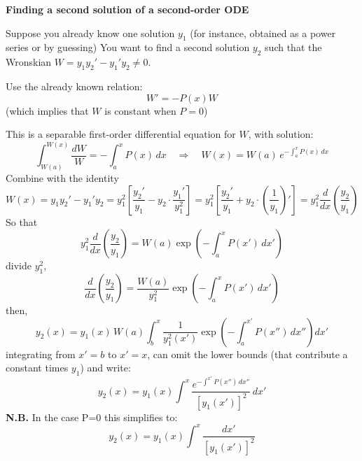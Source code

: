\documentclass{article}
\begin{document}
\vspace{2mm}\noindent
\textbf{Finding a second solution of a second-order ODE}

\noindent
Suppose you already know one solution $y_1$ (for instance, obtained as a power series or by guessing) You want to find a second solution $y_2$ such that the Wronskian $W = y_1 y_2' - y_1' y_2 \neq 0$.

\noindent
Use the already known relation:
\begin{equation}
    W' = -P(x) W
\end{equation}
(which implies that $W$ is constant when $P=0$)

\noindent
This is a separable first-order differential equation for $W$, with solution:
\begin{equation}
    \int_{W(a)}^{W(x)} \frac{dW}{W} = -\int_{a}^{x} P(x)\,dx 
\quad \Rightarrow \quad 
W(x) = W(a) \, e^{- \int_{a}^{x} P(x)\,dx}
\end{equation}
Combine with the identity
\begin{equation}
    W(x) = y_1 y_2' - y_1' y_2 
= y_1^2 \left[ \frac{y_2'}{y_1} - y_2 \cdot \frac{y_1'}{y_1 ^2} \right] 
= y_1^2 \left[ \frac{y_2'}{y_1} + y_2 \cdot \left(\frac{1}{y_1} \right)' \right] 
= y_1^2 \frac{d}{dx} \left( \frac{y_2}{y_1} \right)
\end{equation}
So that
\begin{equation}
y_1^2 \frac{d}{dx} \left( \frac{y_2}{y_1} \right) = W(a) \exp\left( -\int_a^x P(x') \, dx' \right)
\end{equation}
divide $y_1 ^2$,
\begin{equation}
    \frac{d}{dx} \left( \frac{y_2}{y_1} \right) = \frac{W(a)}{y_1 ^2} \exp\left( -\int_a^x P(x') \, dx' \right)
\end{equation}
then, 
\begin{equation}
    y_2(x) = y_1(x) \, W(a) \int_b^x \frac{1}{y_1^2(x')} \exp\left( -\int_a^{x'} P(x'') \, dx'' \right) dx'
\end{equation}
integrating from $x' = b$ to $x' = x$, can omit the lower bounds (that contribute a constant times $y_1$) and write:
\begin{equation}
y_2(x) = y_1(x) \int^x \frac{e^{ -\int^{x'} P(x'')\,dx'' }}{ \left[ y_1(x') \right]^2 } \, dx'
\end{equation}
\textbf{N.B.} In the case P=0 this simplifies to:
\begin{equation}
    y_2(x) = y_1(x) \int^x \frac{dx'}{[y_1(x')]^2}
\end{equation}
\end{document}
